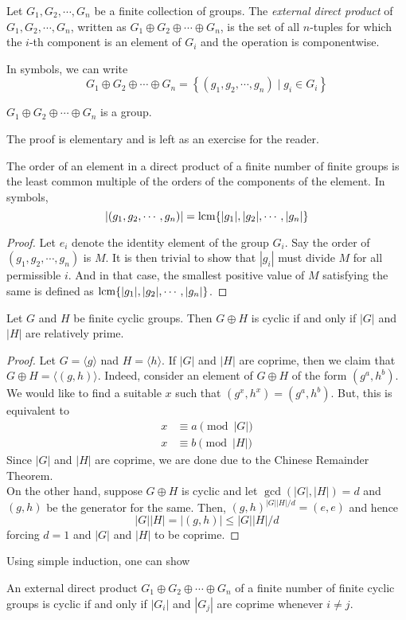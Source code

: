 \begin{definition}
	Let $G_1,G_2,\cdots,G_n$ be a finite collection of groups. The \textit{external direct product} of $G_1,G_2,\cdots,G_n$, written as $G_1\oplus G_2\oplus\cdots\oplus G_n$, is the set of all $n$-tuples for which the $i$-th component is an element of $G_i$ and the operation is componentwise.
\end{definition}

In symbols, we can write 
$$
G_1\oplus G_2\oplus\cdots\oplus G_n = \left\{\left(g_1,g_2,\cdots,g_n\right)\mid g_i\in G_i\right\}
$$

\begin{proposition}
	$G_1\oplus G_2\oplus\cdots\oplus G_n$ is a group.
\end{proposition}
The proof is elementary and is left as an exercise for the reader.

\begin{proposition}
	The order of an element in a direct product of a finite number of finite groups is the least common multiple of the orders of the components of the element. In symbols,
	$$
	|(g_1,g_2,\cdots,g_n)| = \operatorname{lcm}\{|g_1|,|g_2|,\cdots,|g_n|\}
	$$
\end{proposition}
\begin{proof}
	Let $e_i$ denote the identity element of the group $G_i$. Say the order of $(g_1,g_2,\cdots,g_n)$ is $M$. It is then trivial to show that $|g_i|$ must divide $M$ for all permissible $i$. And in that case, the smallest positive value of $M$ satisfying the same is defined as $\operatorname{lcm}\{|g_1|,|g_2|,\cdots,|g_n|\}$.
\end{proof}

\begin{proposition}
	Let $G$ and $H$ be finite cyclic groups. Then $G\oplus H$ is cyclic if and only if $|G|$ and $|H|$ are relatively prime.
\end{proposition}
\begin{proof}
	Let $G=\langle g\rangle$ nad $H=\langle h\rangle $. If $|G|$ and $|H|$ are coprime, then we claim that $G\oplus H=\langle(g,h)\rangle$. Indeed, consider an element of $G\oplus H$ of the form $(g^a,h^b)$. We would like to find a suitable $x$ such that $(g^{x},h^{x})=(g^a,h^b)$. But, this is equivalent to 
	\begin{align*}
		x&\equiv a\pmod{|G|}\\
		x&\equiv b\pmod{|H|}
	\end{align*}
	Since $|G|$ and $|H|$ are coprime, we are done due to the Chinese Remainder Theorem.\\
	On the other hand, suppose $G\oplus H$ is cyclic and let $\gcd(|G|,|H|)=d$ and $(g,h)$ be the generator for the same. Then, $(g,h)^{|G||H|/d}=(e,e)$ and hence 
	$$
	|G||H| = |(g,h)|\le|G||H|/d
	$$
	forcing $d=1$ and $|G|$ and $|H|$ to be coprime.
\end{proof}
Using simple induction, one can show
\begin{corollary}
	An external direct product $G_1\oplus G_2\oplus\cdots\oplus G_n$ of a finite number of finite cyclic groups is cyclic if and only if $|G_i|$ and $|G_j|$ are coprime whenever $i\ne j$.
\end{corollary}

